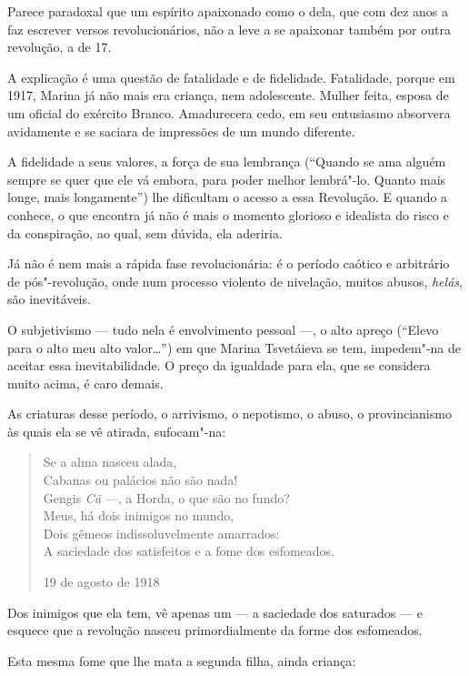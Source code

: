 {{{Parece paradoxal que um espírito apaixonado como o dela, que com dez
anos a faz escrever versos revolucionários, não a leve a se apaixonar
também por outra revolução, a de 17.

A explicação é uma questão de fatalidade e de fidelidade. Fatalidade,
porque em 1917, Marina já não mais era criança, nem adolescente. Mulher
feita, esposa de um oficial do exército Branco. Amadurecera cedo, em seu
entusiasmo absorvera avidamente e se saciara de impressões de um mundo
diferente.

A fidelidade a seus valores, a força de sua lembrança (``Quando se ama
alguém sempre se quer que ele vá embora, para poder melhor lembrá"-lo.
Quanto mais longe, mais longamente'') lhe dificultam o acesso a essa
Revolução. E quando a conhece, o que encontra já não é mais o momento
glorioso e idealista do risco e da conspiração, ao qual, sem dúvida, ela
aderiria.

Já não é nem mais a rápida fase revolucionária: é o período caótico e
arbitrário de pós"-revolução, onde num processo violento de nivelação,
muitos abusos, \emph{helás}, são inevitáveis.

O subjetivismo --- tudo nela é envolvimento pessoal ---, o alto apreço
(``Elevo para o alto meu alto valor\ldots{}'') em que Marina Tsvetáieva se
tem, impedem"-na de aceitar essa inevitabilidade. O preço da igualdade
para ela, que se considera muito acima, é caro demais.

As criaturas desse período, o arrivismo, o nepotismo, o abuso, o
provincianismo às quais ela se vê atirada, sufocam"-na:

\begin{verse}
Se a alma nasceu alada, \\
Cabanas ou palácios não são nada! \\
Gengis \emph{Cã} ---, a Horda, o que são no fundo? \\[8pt]
Meus, há dois inimigos no mundo, \\
Dois gêmeos indissoluvelmente amarrados: \\
A saciedade dos satisfeitos e a fome \qb{}dos esfomeados. 

19 de agosto de 1918

\end{verse}

Dos inimigos que ela tem, vê apenas um --- a saciedade dos saturados --- e
esquece que a revolução nasceu primordialmente da forme dos esfomeados.

Esta mesma fome que lhe mata a segunda filha, ainda criança:

}}}
